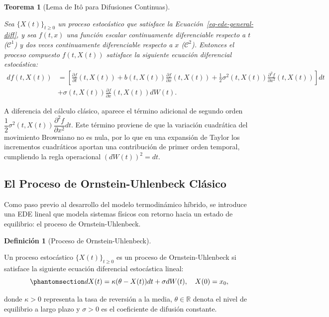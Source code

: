 \documentclass[
  spanish,
  us-letterpaper,
]{scrreprt}
\numberwithin{equation}{section}
\theoremstyle{plain}
\newtheorem{theorem}{Teorema}[chapter]
\theoremstyle{plain}
\theoremstyle{definition}
\newtheorem{definition}{Definición}[chapter]
\theoremstyle{plain}
\theoremstyle{remark}
\begin{document}
\begin{theorem}[Lema de Itô para Difusiones
Continuas]\protect\hypertarget{thm-ito-clasico}{}\label{thm-ito-clasico}

Sea \(\{X(t)\}_{t \ge 0}\) un proceso estocástico que satisface la
Ecuación~\ref{eq-ede-general-diff}, y sea \(f(t, x)\) una función
escalar continuamente diferenciable respecto a \(t\) (\(\mathcal{C}^1\))
y dos veces continuamente diferenciable respecto a \(x\)
(\(\mathcal{C}^2\)). Entonces el proceso compuesto \(f(t, X(t))\)
satisface la siguiente ecuación diferencial estocástica: \[
\begin{aligned}
df(t, X(t)) &= \left[ \frac{\partial f}{\partial t} (t, X(t)) + b(t, X(t))\frac{\partial f}{\partial x} (t, X(t)) + \frac{1}{2}\sigma^2(t, X(t))\frac{\partial^2 f}{\partial x^2} (t, X(t)) \right] dt \\
&+ \sigma(t, X(t))\frac{\partial f}{\partial x} (t, X(t)) dW(t).
\end{aligned}
\]

\end{theorem}

A diferencia del cálculo clásico, aparece el término adicional de
segundo orden
\(\displaystyle \dfrac{1}{2}\sigma^2(t, X(t))\dfrac{\partial^2 f}{\partial x^2} dt\).
Este término proviene de que la variación cuadrática del movimiento
Browniano no es nula, por lo que en una expansión de Taylor los
incrementos cuadráticos aportan una contribución de primer orden
temporal, cumpliendo la regla operacional \((dW(t))^2 = dt\).

\subsection{El Proceso de Ornstein-Uhlenbeck
Clásico}\label{el-proceso-de-ornstein-uhlenbeck-cluxe1sico}

Como paso previo al desarrollo del modelo termodinámico híbrido, se
introduce una EDE lineal que modela sistemas físicos con retorno hacia
un estado de equilibrio: el proceso de Ornstein-Uhlenbeck.

\begin{definition}[Proceso de
Ornstein-Uhlenbeck]\protect\hypertarget{def-ou-clasico}{}\label{def-ou-clasico}

Un proceso estocástico \(\{X(t)\}_{t \ge 0}\) es un proceso de
Ornstein-Uhlenbeck si satisface la siguiente ecuación diferencial
estocástica lineal:
\begin{equation}\phantomsection\label{eq-ou-clasica}{
dX(t) = \kappa (\theta - X(t)) dt + \sigma dW(t), \quad X(0) = x_0,
}\end{equation}

donde \(\kappa > 0\) representa la tasa de reversión a la media,
\(\theta \in \mathbb{R}\) denota el nivel de equilibrio a largo plazo y
\(\sigma > 0\) es el coeficiente de difusión constante.

\end{definition}
\end{document}
